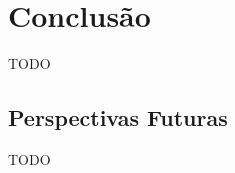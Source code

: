 \chapter{Conclusão}\label{cap:conclusoeseperspectivas}

TODO






\section{Perspectivas Futuras}\label{sec:perspectivasFuturas}

TODO

